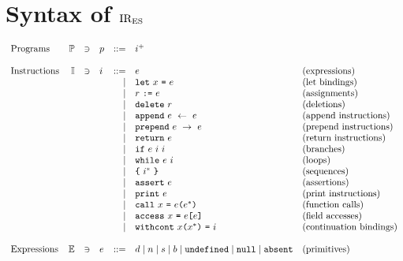 \section{Syntax of \( \text{IR}_\text{ES} \)}

\[
  \begin{array}{lrclrll}
    \text{Programs} & \prset &\ni& \pr & ::= & \inst^+          & \text{}\\
    \\
    \text{Instructions} & \instset &\ni& \inst &
    ::= & \expr & \text{(expressions)} \\
    &&&&\mid& \C{let}\ \id\ \C{=}\ \expr                        & \text{(let bindings)}\\
    &&&&\mid& \refvalue\ \C{:=}\ \expr                          & \text{(assignments)}\\
    &&&&\mid& \C{delete}\ \refvalue                             & \text{(deletions)}\\
    &&&&\mid& \C{append}\ \expr\ \leftarrow\ \expr              & \text{(append instructions)}\\
    &&&&\mid& \C{prepend}\ \expr\ \rightarrow\ \expr            & \text{(prepend instructions)}\\
    &&&&\mid& \C{return}\ \expr                                 & \text{(return instructions)}\\
    &&&&\mid& \C{if}\ \expr\ \inst\ \inst                       & \text{(branches)}\\
    &&&&\mid& \C{while}\ \expr\ \inst                           & \text{(loops)}\\
    &&&&\mid& \C{\{}\ \inst^*\ \C{\}}                           & \text{(sequences)}\\
    &&&&\mid& \C{assert}\ \expr                                 & \text{(assertions)}\\
    &&&&\mid& \C{print}\ \expr                                  & \text{(print instructions)}\\
    &&&&\mid& \C{call}\ \id\ \C{=}\ \expr \C{(} \expr^* \C{)}   & \text{(function calls)}\\
    &&&&\mid& \C{access}\ \id\ \C{=}\ \expr \C{[} \expr \C{]}   & \text{(field accesses)}\\
    &&&&\mid& \C{withcont}\ \id \C{(} \id^* \C{)}\ \C{=}\ \inst & \text{(continuation bindings)}\\
    \\
    \text{Expressions} & \exprset &\ni& \expr &
    ::= & \double \mid \intvalue \mid \str \mid \bool \mid
          \C{undefined} \mid \C{null} \mid \C{absent}           & \text{(primitives)}\\

\end{array}\]
